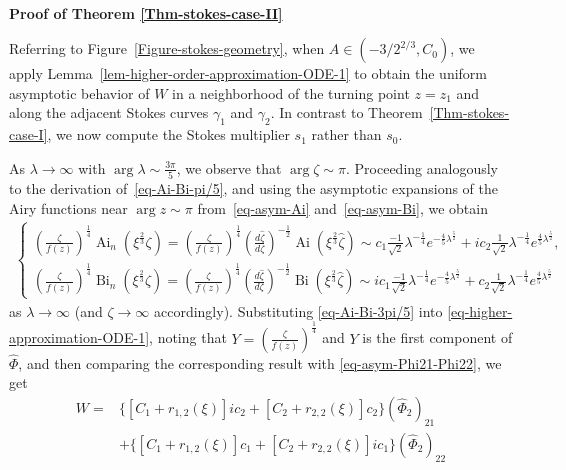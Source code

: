 \documentclass[12pt]{article}
\theoremstyle{plain}
\theoremstyle{definition}
\numberwithin{equation}{section}
\newcommand\Ai{\operatorname{Ai}}
\newcommand\Bi{\operatorname{Bi}}
\begin{document}
\

\textbf{Proof of Theorem \ref{Thm-stokes-case-II}}


Referring to Figure~\ref{Figure-stokes-geometry}, when $A\in(-3/2^{2/3}, C_{0})$, we apply Lemma~\ref{lem-higher-order-approximation-ODE-1} to obtain the uniform asymptotic behavior of $W$ in a neighborhood of the turning point $z = z_1$ and along the adjacent Stokes curves $\gamma_1$ and $\gamma_2$. In contrast to Theorem~\ref{Thm-stokes-case-I}, we now compute the Stokes multiplier $s_1$ rather than $s_0$.

As $\lambda \to \infty$ with $\arg \lambda \sim \frac{3\pi}{5}$, we observe that $\arg \zeta \sim \pi$. Proceeding analogously to the derivation of~\eqref{eq-Ai-Bi-pi/5}, and using the asymptotic expansions of the Airy functions near $\arg z \sim \pi$ from~\eqref{eq-asym-Ai} and~\eqref{eq-asym-Bi}, we obtain
\begin{eqnarray}\label{eq-Ai-Bi-3pi/5}
\begin{cases}
\left(\frac{\zeta}{f(z)}\right)^{\frac{1}{4}}\Ai_{n}(\xi^{\frac{2}{3}}\zeta)=\left(\frac{\zeta}{f(z)}\right)^{\frac{1}{4}}\left(\frac{d\widehat{\zeta}}{d\zeta}\right)^{-\frac{1}{2}}\Ai\left(\xi^{\frac{2}{3}}\widehat{\zeta}\right)\sim c_{1}\frac{-1}{\sqrt{2}}\lambda^{-\frac{1}{4}}e^{-\frac{4}{5}\lambda^{\frac{5}{2}}}+ic_{2}\frac{1}{\sqrt{2}}\lambda^{-\frac{1}{4}}e^{\frac{4}{5}\lambda^{\frac{5}{2}}},\\
\left(\frac{\zeta}{f(z)}\right)^{\frac{1}{4}}\Bi_{n}(\xi^{\frac{2}{3}}\zeta)=\left(\frac{\zeta}{f(z)}\right)^{\frac{1}{4}}\left(\frac{d\widehat{\zeta}}{d\zeta}\right)^{-\frac{1}{2}}\Bi\left(\xi^{\frac{2}{3}}\widehat{\zeta}\right)\sim ic_{1}\frac{-1}{\sqrt{2}}\lambda^{-\frac{1}{4}}e^{-\frac{4}{5}\lambda^{\frac{5}{2}}}+c_{2}\frac{1}{\sqrt{2}}\lambda^{-\frac{1}{4}}e^{\frac{4}{5}\lambda^{\frac{5}{2}}}
\end{cases}
\end{eqnarray}
as $\lambda\to\infty$ (and $\zeta\to\infty$ accordingly). Substituting \eqref{eq-Ai-Bi-3pi/5} into \eqref{eq-higher-approximation-ODE-1}, noting that $Y=\left(\frac{\zeta}{f(z)}\right)^{\frac{1}{4}}$ and $Y$ is the first component of $\widehat{\Phi}$,
and then comparing the corresponding result with \eqref{eq-asym-Phi21-Phi22},
we get
\begin{equation}\label{eq-Y-3pi/5-C}
\begin{split}
W=&\{[C_{1}+r_{1,2}(\xi)]ic_{2}+[C_{2}+r_{2,2}(\xi)]c_{2}\}(\widehat{\Phi}_{2})_{21}\\
&+\{[C_{1}+r_{1,2}(\xi)]c_{1}+[C_{2}+r_{2,2}(\xi)]ic_{1}\}(\widehat{\Phi}_{2})_{22}
\end{split}
\end{equation}
\end{document}
